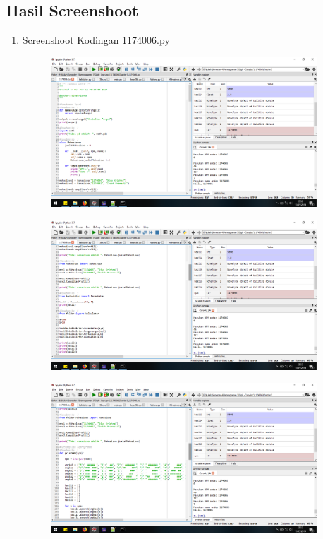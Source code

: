 \subsection{Hasil Screenshoot}
\begin{enumerate}
\item Screenshoot Kodingan 1174006.py
\begin{figure}[H]
	\includegraphics[width=10cm]{figures/diva/Chapter3/1174006_1.png}
	\centering
\end{figure}
\begin{figure}[H]
	\includegraphics[width=10cm]{figures/diva/Chapter3/1174006_2.png}
	\centering
\end{figure}
\begin{figure}[H]
	\includegraphics[width=10cm]{figures/diva/Chapter3/1174006_3.png}
	\centering
\end{figure}
\begin{figure}[H]

\end{figure}
\end{enumerate}
